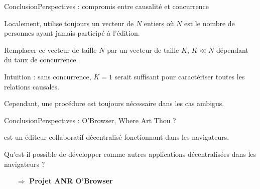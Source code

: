 \begin{frame}{Conclusion}{Perspectives : compromis entre causalité et concurrence}
  
  Localement, \CRATE utilise toujours un vecteur de $N$ entiers où $N$ est le
  nombre de personnes ayant jamais participé à l'édition.
  
  \vspace{0.5cm}

  Remplacer ce vecteur de taille $N$ par un vecteur de taille $K$, $K\ll N$
  dépendant du taux de concurrence.

  \vspace{0.5cm}

  Intuition : sans concurrence, $K=1$ serait suffisant pour caractériser toutes
  les relations causales.

  \vspace{0.5cm}

  Cependant, une procédure est toujours nécessaire dans les cas ambigus.

\end{frame}


\begin{frame}{Conclusion}{Perspectives : O'Browser, Where Art Thou ?}

  

  \CRATE est un éditeur collaboratif décentralisé fonctionnant dans les
  navigateurs.

  \vspace{0.25cm}

  Qu'est-il possible de développer comme autres applications décentralisées dans
  les navigateurs ?

  \vspace{0.25cm}
  

  \begin{center}
    
  \end{center}

  \vspace{0.25cm}
  
  \large
  \begin{itemize}
  \item [$\Rightarrow$] \textbf{Projet ANR O'Browser}
  \end{itemize}


\end{frame}